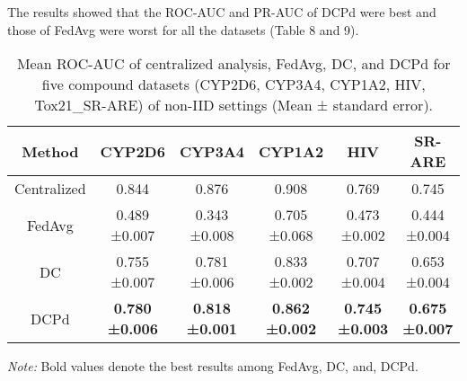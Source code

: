 \documentclass{article}
\begin{document}
The results showed that the ROC-AUC and PR-AUC of DCPd were best and those of FedAvg were worst for all the datasets (Table 8 and 9).


\begin{table}[htbp]
\centering
\begin{threeparttable}
\caption{Mean ROC-AUC of centralized analysis, FedAvg, DC, and DCPd for five compound datasets (CYP2D6, CYP3A4, CYP1A2, HIV, Tox21\_SR-ARE) of non-IID settings (Mean ± standard error).}
\label{tab:Table 7}
\begin{tabular}{cccccc}
\hline
Method & CYP2D6 & CYP3A4 & CYP1A2 & HIV & SR-ARE \\
\hline
Centralized & 0.844 & 0.876 & 0.908 & 0.769 & 0.745\\
FedAvg & \makecell{0.489 \\ ±0.007} & \makecell{0.343 \\ ±0.008} & \makecell{0.705 \\ ±0.068} & \makecell{0.473 \\ ±0.002} & \makecell{0.444 \\ ±0.004} \\
DC & \makecell{0.755 \\ ±0.007} & \makecell{0.781 \\ ±0.006} & \makecell{0.833 \\ ±0.002} & \makecell{0.707 \\ ±0.004} & \makecell{0.653 \\ ±0.004} \\
DCPd & \makecell{\textbf{0.780} \\ \textbf{±0.006}} & \makecell{\textbf{0.818} \\ \textbf{±0.001}} & \makecell{\textbf{0.862} \\ \textbf{±0.002}} & \makecell{\textbf{0.745} \\ \textbf{±0.003}} & \makecell{\textbf{0.675} \\ \textbf{±0.007}} \\
\hline
\end{tabular}
\begin{tablenotes}
\small
\item \textit{Note:} Bold values denote the best results among FedAvg, DC, and, DCPd.
\end{tablenotes}
\end{threeparttable}
\end{table}
\end{document}
